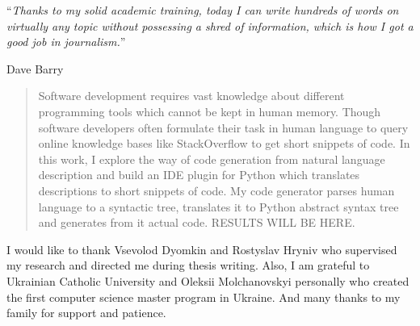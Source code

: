 \documentclass[
12pt, %
oneside, %
english, %
onehalfspacing, %
nolistspacing, %
liststotoc, %
parskip, %
headsepline, %
]{MastersDoctoralThesis} %
\begin{document}
\cleardoublepage


\vspace*{0.2\textheight}

\noindent\enquote{\itshape Thanks to my solid academic training, today I can write hundreds of words on virtually any topic without possessing a shred of information, which is how I got a good job in journalism.}\bigbreak

\hfill Dave Barry

\begin{abstract}
\addchaptertocentry{\abstractname} %
Software development requires vast knowledge about different programming tools which cannot be kept in human memory. Though software developers often formulate their task in human language to query online knowledge bases like StackOverflow to get short snippets of code. In this work, I explore the way of code generation from natural language description and build an IDE plugin for Python which translates descriptions to short snippets of code. My code generator parses human language to a syntactic tree, translates it to Python abstract syntax tree and generates from it actual code. RESULTS WILL BE HERE.
\end{abstract}


\begin{acknowledgements}
\addchaptertocentry{\acknowledgementname} %
I would like to thank Vsevolod Dyomkin and Rostyslav Hryniv who supervised my research and directed me during thesis writing. Also, I am grateful to Ukrainian Catholic University and Oleksii  Molchanovskyi personally who created the first computer science master program in Ukraine. And many thanks to my family for support and patience. 
\end{acknowledgements}
\end{document}
